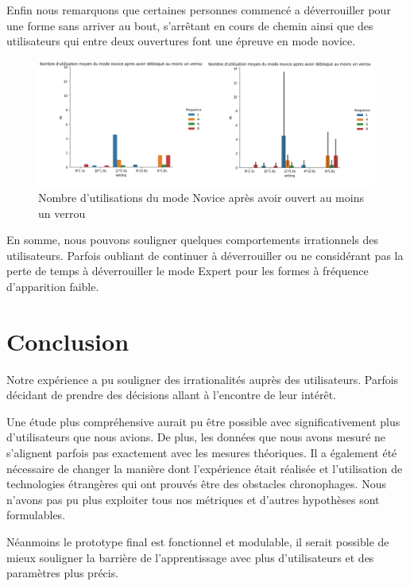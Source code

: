 \documentclass[a4paper, 12pt]{report}
\begin{document}
        Enfin nous remarquons que certaines personnes commencé a déverrouiller pour une forme
        sans arriver au bout, s'arrêtant en cours de chemin ainsi que des utilisateurs qui entre deux
        ouvertures font une épreuve en mode novice.
        
        \begin{figure}[H]
            \centering
            \includegraphics[width=1\textwidth]{img/fig10.png}
            \caption{Nombre d'utilisations du mode Novice après avoir ouvert au moins un verrou}
        \end{figure}
        
        En somme, nous pouvons souligner quelques comportements irrationnels des utilisateurs.
        Parfois oubliant de continuer à déverrouiller ou ne considérant pas la perte de temps à
        déverrouiller le mode Expert pour les formes à fréquence d'apparition faible.
        
    
    \chapter{Conclusion}
    Notre expérience a pu souligner des irrationalités auprès des utilisateurs. Parfois décidant
    de prendre des décisions allant à l'encontre de leur intérêt.
    
    Une étude plus compréhensive aurait pu être possible avec significativement plus d'utilisateurs
    que nous avions. De plus, les données que nous avons mesuré ne s'alignent parfois pas
    exactement avec les mesures théoriques. Il a également été nécessaire de changer la
    manière dont l'expérience était réalisée et l'utilisation de technologies étrangères qui
    ont prouvés être des obstacles chronophages.
    Nous n'avons pas pu plus exploiter tous nos métriques et d'autres hypothèses sont formulables.
    
    Néanmoins le prototype final est fonctionnel et modulable, il serait possible de mieux souligner la barrière de l'apprentissage avec plus d'utilisateurs et des paramètres plus précis.
    
\end{document}
